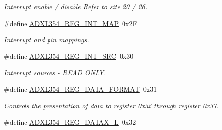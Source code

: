 \begin{DoxyCompactItemize}
\begin{DoxyCompactList}\small\item\em \-Interrupt enable / disable \-Refer to site 20 / 26. \end{DoxyCompactList}\item 
\hypertarget{group___a_d_x_l354___r_e_g_i_s_t_e_r_s_ga71639672526dfd0e0fbadd13001900c1}{\#define \hyperlink{group___a_d_x_l354___r_e_g_i_s_t_e_r_s_ga71639672526dfd0e0fbadd13001900c1}{\-A\-D\-X\-L354\-\_\-\-R\-E\-G\-\_\-\-I\-N\-T\-\_\-\-M\-A\-P}~0x2\-F}\label{group___a_d_x_l354___r_e_g_i_s_t_e_r_s_ga71639672526dfd0e0fbadd13001900c1}

\begin{DoxyCompactList}\small\item\em \-Interrupt and pin mappings. \end{DoxyCompactList}\item 
\hypertarget{group___a_d_x_l354___r_e_g_i_s_t_e_r_s_ga45acc9daef157794ac6889aa3a802fee}{\#define \hyperlink{group___a_d_x_l354___r_e_g_i_s_t_e_r_s_ga45acc9daef157794ac6889aa3a802fee}{\-A\-D\-X\-L354\-\_\-\-R\-E\-G\-\_\-\-I\-N\-T\-\_\-\-S\-R\-C}~0x30}\label{group___a_d_x_l354___r_e_g_i_s_t_e_r_s_ga45acc9daef157794ac6889aa3a802fee}

\begin{DoxyCompactList}\small\item\em \-Interrupt sources -\/ \-R\-E\-A\-D \-O\-N\-L\-Y. \end{DoxyCompactList}\item 
\hypertarget{group___a_d_x_l354___r_e_g_i_s_t_e_r_s_ga612234c31741911cdfd5079c5f18f237}{\#define \hyperlink{group___a_d_x_l354___r_e_g_i_s_t_e_r_s_ga612234c31741911cdfd5079c5f18f237}{\-A\-D\-X\-L354\-\_\-\-R\-E\-G\-\_\-\-D\-A\-T\-A\-\_\-\-F\-O\-R\-M\-A\-T}~0x31}\label{group___a_d_x_l354___r_e_g_i_s_t_e_r_s_ga612234c31741911cdfd5079c5f18f237}

\begin{DoxyCompactList}\small\item\em \-Controls the presentation of data to register 0x32 through register 0x37. \end{DoxyCompactList}\item 
\hypertarget{group___a_d_x_l354___r_e_g_i_s_t_e_r_s_ga7c3173b923eeaf75f61f0a261a3cd407}{\#define \hyperlink{group___a_d_x_l354___r_e_g_i_s_t_e_r_s_ga7c3173b923eeaf75f61f0a261a3cd407}{\-A\-D\-X\-L354\-\_\-\-R\-E\-G\-\_\-\-D\-A\-T\-A\-X\-\_\-\-L}~0x32}\label{group___a_d_x_l354___r_e_g_i_s_t_e_r_s_ga7c3173b923eeaf75f61f0a261a3cd407}


\end{DoxyCompactItemize}
